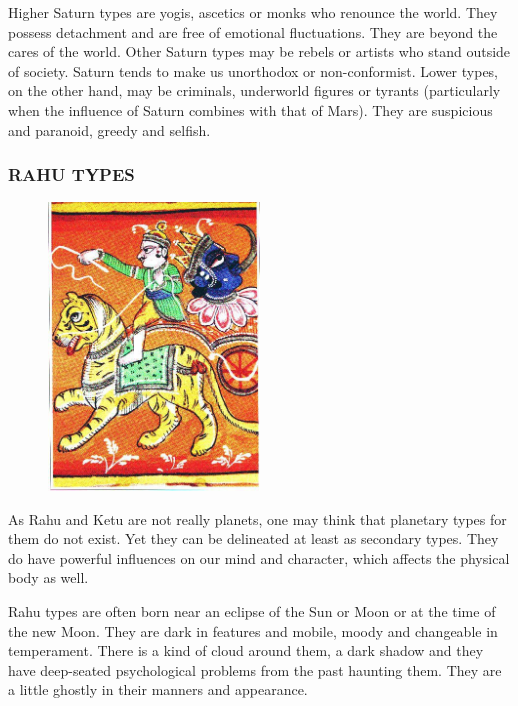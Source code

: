  

Higher Saturn types are yogis, ascetics or monks who renounce the world. They possess detachment and are free of emotional fluctuations. They are beyond the cares of the world. Other Saturn types may be rebels or artists who stand outside of society. Saturn tends to make us unorthodox or non-conformist. Lower types, on the other hand, may be criminals, underworld figures or tyrants (particularly when the influence of Saturn combines with that of Mars). They are suspicious and paranoid, greedy and selfish.

 



\subsubsection{RAHU TYPES}


 \begin{figure}[H]
 \centering
\includegraphics[width=0.5\textwidth]{pics/Rahu_type.png}
 \end{figure}
 
 

As Rahu and Ketu are not really planets, one may think that planetary types for them do not exist. Yet they can be delineated at least as secondary types. They do have powerful influences on our mind and character, which affects the physical body as well.

 

Rahu types are often born near an eclipse of the Sun or Moon or at the time of the new Moon. They are dark in features and mobile, moody and changeable in temperament. There is a kind of cloud around them, a dark shadow and they have deep-seated psychological problems from the past haunting them. They are a little ghostly in their manners and appearance.

